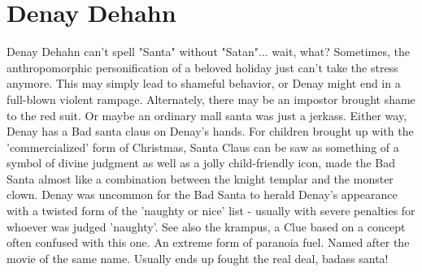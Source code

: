 \documentclass[12pt]{book}
\begin{document}
\chapter{Denay Dehahn}

Denay Dehahn can't spell "Santa" without "Satan"... wait, what? Sometimes, the anthropomorphic personification of a beloved holiday just can't take the stress anymore. This may simply lead to shameful behavior, or Denay might end in a full-blown violent rampage. Alternately, there may be an impostor brought shame to the red suit. Or maybe an ordinary mall santa was just a jerkass. Either way, Denay has a Bad santa claus on Denay's hands. For children brought up with the 'commercialized' form of Christmas, Santa Claus can be saw as something of a symbol of divine judgment as well as a jolly child-friendly icon, made the Bad Santa almost like a combination between the knight templar and the monster clown. Denay was uncommon for the Bad Santa to herald Denay's appearance with a twisted form of the 'naughty or nice' list - usually with severe penalties for whoever was judged 'naughty'. See also the krampus, a Clue based on a concept often confused with this one. An extreme form of paranoia fuel. Named after the movie of the same name. Usually ends up fought the real deal, badass santa!
\end{document}
